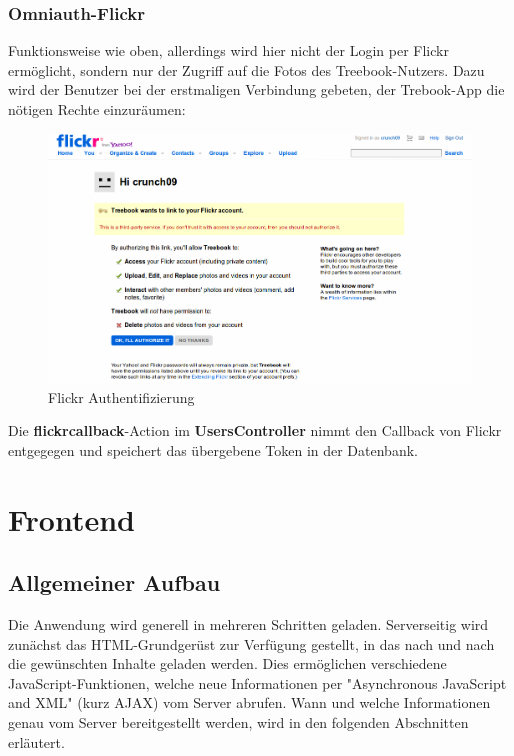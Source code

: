 \documentclass[10pt,a4paper]{book}
\makeatletter
\def\ScaleIfNeeded{%
\ifdim\Gin@nat@width>\linewidth
\linewidth
\else
\Gin@nat@width
\fi
}
\makeatother
\begin{document}
\subsection{Omniauth-Flickr}
Funktionsweise wie oben, allerdings wird hier nicht der Login per Flickr ermöglicht, sondern nur der Zugriff auf die Fotos des Treebook-Nutzers. Dazu wird der Benutzer bei der erstmaligen Verbindung gebeten, der Trebook-App die nötigen Rechte einzuräumen:
\begin{figure}[htbp]
\centering
\includegraphics[width=\ScaleIfNeeded]{Pictures/screen_flickr_auth.png}%
\caption{Flickr Authentifizierung}%
\end{figure}
Die \textbf{flickrcallback}-Action im \textbf{UsersController} nimmt den Callback von Flickr entgegegen und speichert das übergebene Token in der Datenbank.
\chapter{Frontend}
\section{Allgemeiner Aufbau}
Die Anwendung wird generell in mehreren Schritten geladen. Serverseitig wird zunächst das HTML-Grundgerüst zur Verfügung gestellt, in das nach und nach die gewünschten Inhalte geladen werden.
Dies ermöglichen verschiedene JavaScript-Funktionen, welche neue Informationen per "Asynchronous JavaScript and XML" (kurz AJAX) vom Server abrufen.
Wann und welche Informationen genau vom Server bereitgestellt werden, wird in den folgenden Abschnitten erläutert.
\end{document}
